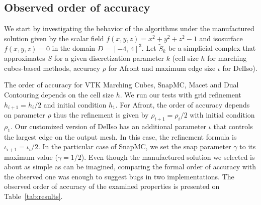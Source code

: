 
\subsection{Observed order of accuracy}
\label{chap1:sec:verification-results}

We start by investigating the behavior of the algorithms 
under the manufactured solution given by the
scalar field $f(x,y,z) = x^2+y^2+z^2 - 1$ and isosurface $f(x,y,z) =
0$ in the domain $D=[-4,\, 4]^3$.
Let $\tilde{S}_k$ be a simplicial complex that approximates $S$ for a given 
discretization parameter $k$ (cell size $h$ for marching cubes-based methods, 
accuracy $\rho$ for Afront and maximum edge size $\iota$ for DelIso).

The order of accuracy for VTK Marching Cubes, SnapMC, Macet and Dual
Contouring depends on the cell size $h$. We run our tests with grid
refinement $h_{i+1} = h_{i} / 2$ and initial condition $h_1$. For
Afront, the order of accuracy depends on parameter $\rho$ thus the
refinement is given by $\rho_{i+1} = \rho_{i} / 2$ with initial
condition $\rho_1$. Our customized version of DelIso has an additional parameter $\iota$
that controls the largest edge on the output mesh. In this case, the refinement 
formula is
$\iota_{i+1} = \iota_{i} / 2$.
In the particular case of SnapMC, we set the snap
parameter  $\gamma$ to its maximum value ($\gamma = 1/2$). Even though
the manufactured solution we selected is about as simple as can be
imagined, comparing the formal order of accuracy with the observed one
was enough to suggest bugs in two implementations. The observed
order of accuracy of the examined properties 
is presented on Table~\ref{tab:results}.

